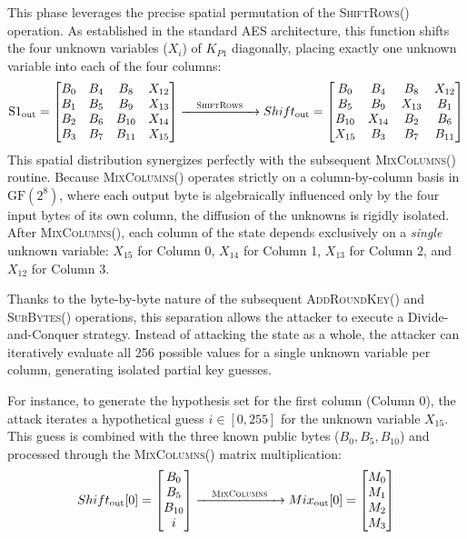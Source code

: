 \documentclass[11pt,a4paper]{report}
\begin{document}
This phase leverages the precise spatial permutation of the \textsc{ShiftRows()} operation. 
As established in the standard AES architecture, this function shifts the four unknown variables ($X_i$) of $K_{P1}$ diagonally, 
placing exactly one unknown variable into each of the four columns:
\[
\text{S1}_{\text{out}} = \begin{bmatrix}
    B_0 & B_4 & B_8 & X_{12} \\
    B_1 & B_5 & B_9 & X_{13} \\
    B_2 & B_6 & B_{10} & X_{14} \\
    B_3 & B_7 & B_{11} & X_{15}
\end{bmatrix}
\xrightarrow{\quad \textsc{ShiftRows} \quad}
Shift_{\text{out}} = \begin{bmatrix}
    B_0 & B_4 & B_8 & X_{12} \\
    B_5 & B_9 & X_{13} & B_1 \\
    B_{10} & X_{14} & B_2 & B_6 \\
    X_{15} & B_3 & B_7 & B_{11}
\end{bmatrix}
\]
This spatial distribution synergizes perfectly with the subsequent \textsc{MixColumns()} routine. 
Because \textsc{MixColumns()} operates strictly on a column-by-column basis in $\mathrm{GF}(2^8)$, 
where each output byte is algebraically influenced only by the four input bytes of its own column, the diffusion of the unknowns is rigidly isolated. 
After \textsc{MixColumns()}, each column of the state depends exclusively on a \textit{single} unknown variable: $X_{15}$ for Column 0, $X_{14}$ for Column 1, $X_{13}$ for Column 2, and $X_{12}$ for Column 3. 

Thanks to the byte-by-byte nature of the subsequent \textsc{AddRoundKey()} and \textsc{SubBytes()} operations, 
this separation allows the attacker to execute a Divide-and-Conquer strategy. 
Instead of attacking the state as a whole, the attacker can iteratively evaluate all 256 possible values for a single unknown variable per column, generating isolated partial key guesses.

For instance, to generate the hypothesis set for the first column (Column 0), the attack iterates a hypothetical guess $i \in [0, 255]$ for the unknown variable $X_{15}$. 
This guess is combined with the three known public bytes ($B_0, B_5, B_{10}$) and processed through the \textsc{MixColumns()} matrix multiplication:
\[
Shift_{\text{out}}[0] = \begin{bmatrix}
    B_0 \\
    B_5 \\
    B_{10} \\
    i
\end{bmatrix}
\xrightarrow{\quad \textsc{MixColumns} \quad}
Mix_{\text{out}}[0] = \begin{bmatrix}
    M_0 \\
    M_1 \\
    M_2 \\
    M_3
\end{bmatrix}
\]
\end{document}
